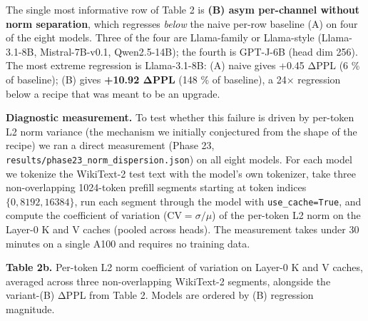 The single most informative row of Table 2 is \textbf{(B) asym
per-channel without norm separation}, which regresses \emph{below} the
naive per-row baseline (A) on four of the eight models. Three of the
four are Llama-family or Llama-style (Llama-3.1-8B, Mistral-7B-v0.1,
Qwen2.5-14B); the fourth is GPT-J-6B (head dim 256). The most extreme
regression is Llama-3.1-8B: (A) naive gives +0.45 ΔPPL (6 \% of
baseline); (B) gives \textbf{+10.92 ΔPPL} (148 \% of baseline), a 24×
regression below a recipe that was meant to be an upgrade.

\textbf{Diagnostic measurement.} To test whether this failure is driven
by per-token L2 norm variance (the mechanism we initially conjectured
from the shape of the recipe) we ran a direct measurement (Phase 23,
\texttt{results/phase23\_norm\_dispersion.json}) on all eight models.
For each model we tokenize the WikiText-2 test text with the model's own
tokenizer, take three non-overlapping 1024-token prefill segments
starting at token indices \(\{0, 8192, 16384\}\), run each segment
through the model with \texttt{use\_cache=True}, and compute the
coefficient of variation (\(\mathrm{CV} = \sigma / \mu\)) of the
per-token L2 norm on the Layer-0 K and V caches (pooled across heads).
The measurement takes under 30 minutes on a single A100 and requires no
training data.

\textbf{Table 2b.} Per-token L2 norm coefficient of variation on Layer-0
K and V caches, averaged across three non-overlapping WikiText-2
segments, alongside the variant-(B) ΔPPL from Table 2. Models are
ordered by (B) regression magnitude.

